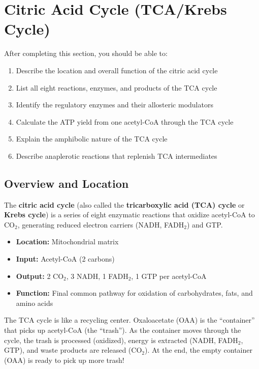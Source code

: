 \section{Citric Acid Cycle (TCA/Krebs Cycle)}

\begin{learningobjectives}
After completing this section, you should be able to:
\begin{enumerate}
    \item Describe the location and overall function of the citric acid cycle
    \item List all eight reactions, enzymes, and products of the TCA cycle
    \item Identify the regulatory enzymes and their allosteric modulators
    \item Calculate the ATP yield from one acetyl-CoA through the TCA cycle
    \item Explain the amphibolic nature of the TCA cycle
    \item Describe anaplerotic reactions that replenish TCA intermediates
\end{enumerate}
\end{learningobjectives}

\subsection{Overview and Location}

\begin{definition}
The \textbf{citric acid cycle} (also called the \textbf{tricarboxylic acid (TCA) cycle} or \textbf{Krebs cycle}) is a series of eight enzymatic reactions that oxidize acetyl-CoA to CO$_2$, generating reduced electron carriers (NADH, FADH$_2$) and GTP.
\end{definition}

\begin{itemize}
    \item \textbf{Location:} Mitochondrial matrix
    \item \textbf{Input:} Acetyl-CoA (2 carbons)
    \item \textbf{Output:} 2 CO$_2$, 3 NADH, 1 FADH$_2$, 1 GTP per acetyl-CoA
    \item \textbf{Function:} Final common pathway for oxidation of carbohydrates, fats, and amino acids
\end{itemize}

\begin{analogy}
The TCA cycle is like a recycling center. Oxaloacetate (OAA) is the ``container'' that picks up acetyl-CoA (the ``trash''). As the container moves through the cycle, the trash is processed (oxidized), energy is extracted (NADH, FADH$_2$, GTP), and waste products are released (CO$_2$). At the end, the empty container (OAA) is ready to pick up more trash!
\end{analogy}

